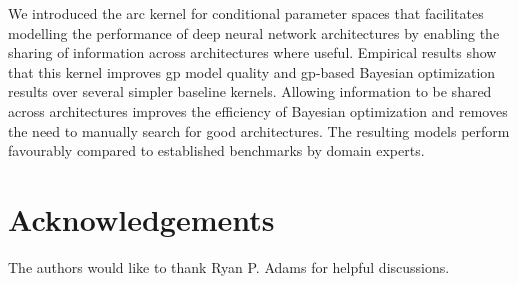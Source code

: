 \documentclass{article}
\newcommand{\gp}{{\sc gp}}
\begin{document}
We introduced the arc kernel for conditional parameter spaces that facilitates modelling the performance of deep neural network architectures by enabling the sharing of information across architectures where useful.
Empirical results show that this kernel improves \gp{} model quality and \gp{}-based Bayesian optimization results over several simpler baseline kernels. Allowing information to be shared across architectures improves the efficiency of Bayesian optimization and removes the need to manually search for good architectures. The resulting models perform favourably compared to established benchmarks by domain experts.

\section{Acknowledgements}
The authors would like to thank Ryan P. Adams for helpful discussions.



\end{document}
